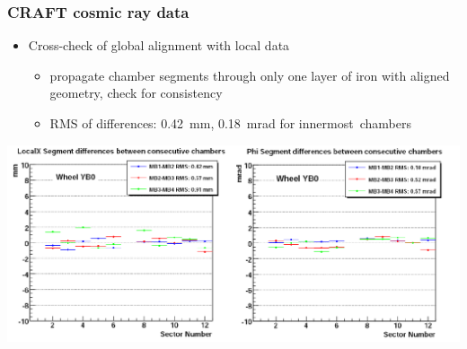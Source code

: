 \documentclass[compress]{beamer}
\begin{document}
\begin{frame}
\frametitle{CRAFT cosmic ray data}

\begin{itemize}
\item Cross-check of global alignment with local data
\begin{itemize}\setlength{\itemsep}{0.2 cm}
\item propagate chamber segments through only one layer of iron with
  aligned geometry, check for consistency
\item RMS of differences: 0.42~mm, 0.18~mrad for \mbox{innermost chambers\hspace{-1 cm}}
\end{itemize}

\end{itemize}

\vfill
\includegraphics[width=\linewidth]{segment_extrapolation.png}
\end{frame}
\end{document}

